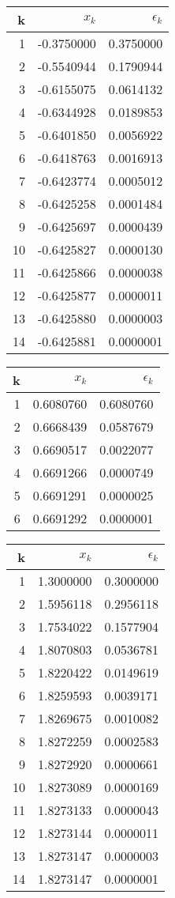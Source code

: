 \documentclass[]{article}
\begin{document}
\begin{tabular}[t]{ |r|r r| }
\hline
k & $x_k$ & $\epsilon_k$\\
\hline
1 & -0.3750000 & 0.3750000 \\
2 & -0.5540944 & 0.1790944 \\
3 & -0.6155075 & 0.0614132 \\
4 & -0.6344928 & 0.0189853 \\
5 & -0.6401850 & 0.0056922 \\
6 & -0.6418763 & 0.0016913 \\
7 & -0.6423774 & 0.0005012 \\
8 & -0.6425258 & 0.0001484 \\
9 & -0.6425697 & 0.0000439 \\
10 & -0.6425827 & 0.0000130 \\
11 & -0.6425866 & 0.0000038 \\
12 & -0.6425877 & 0.0000011 \\
13 & -0.6425880 & 0.0000003 \\
14 & -0.6425881 & 0.0000001 \\
\hline
\end{tabular}
\begin{tabular}[t]{ |r|r r| }
\hline
k & $x_k$ & $\epsilon_k$\\
\hline
1 & 0.6080760 & 0.6080760 \\
2 & 0.6668439 & 0.0587679 \\
3 & 0.6690517 & 0.0022077 \\
4 & 0.6691266 & 0.0000749 \\
5 & 0.6691291 & 0.0000025 \\
6 & 0.6691292 & 0.0000001 \\
\hline
\end{tabular}
\begin{tabular}[t]{ |r|r r| }
\hline
k & $x_k$ & $\epsilon_k$\\
\hline
1 & 1.3000000 & 0.3000000 \\
2 & 1.5956118 & 0.2956118 \\
3 & 1.7534022 & 0.1577904 \\
4 & 1.8070803 & 0.0536781 \\
5 & 1.8220422 & 0.0149619 \\
6 & 1.8259593 & 0.0039171 \\
7 & 1.8269675 & 0.0010082 \\
8 & 1.8272259 & 0.0002583 \\
9 & 1.8272920 & 0.0000661 \\
10 & 1.8273089 & 0.0000169 \\
11 & 1.8273133 & 0.0000043 \\
12 & 1.8273144 & 0.0000011 \\
13 & 1.8273147 & 0.0000003 \\
14 & 1.8273147 & 0.0000001 \\
\hline
\end{tabular}
\end{document}
